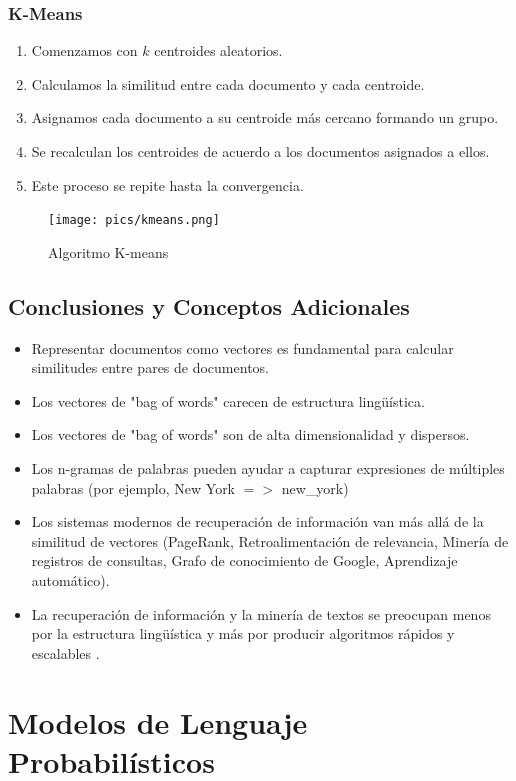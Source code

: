 \documentclass{book}
\begin{document}
\subsection{K-Means}
\begin{enumerate}
\item Comenzamos con $k$ centroides aleatorios.
\item Calculamos la similitud entre cada documento y cada centroide.
\item Asignamos cada documento a su centroide más cercano formando un grupo.
\item Se recalculan los centroides de acuerdo a los documentos asignados a ellos.
\item Este proceso se repite hasta la convergencia.
\end{enumerate}

\begin{figure}[h!]
\centering
\texttt{[image: pics/kmeans.png]}
\caption{ Algoritmo K-means}
\end{figure}

\section{Conclusiones y Conceptos Adicionales}
\begin{itemize}
\item Representar documentos como vectores es fundamental para calcular similitudes entre pares de documentos.
\item Los vectores de "bag of words" carecen de estructura lingüística.
\item Los vectores de "bag of words" son de alta dimensionalidad y dispersos.
\item Los n-gramas de palabras pueden ayudar a capturar expresiones de múltiples palabras (por ejemplo, New York $=>$ new\_york)
\item Los sistemas modernos de recuperación de información van más allá de la similitud de vectores (PageRank, Retroalimentación de relevancia, Minería de registros de consultas, Grafo de conocimiento de Google, Aprendizaje automático).
\item La recuperación de información y la minería de textos se preocupan menos por la estructura lingüística y más por producir algoritmos rápidos y escalables \cite{jacobbook}.
\end{itemize}

\chapter{Modelos de Lenguaje Probabilísticos}
\end{document}
